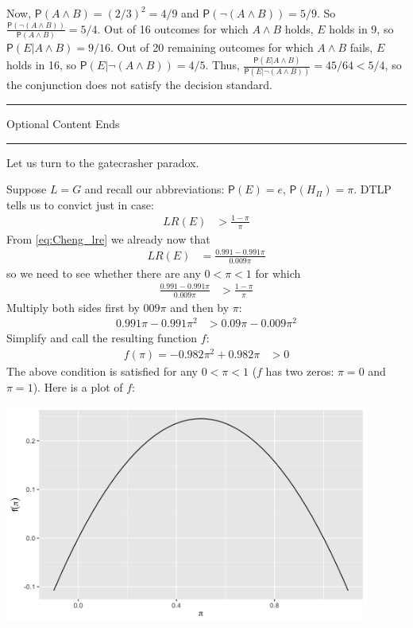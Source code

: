 \documentclass[10pt,dvipsnames,enabledeprecatedfontcommands]{scrartcl}
\newcommand{\n}{\neg}
\newcommand{\et}{\wedge}
\newcommand{\pr}[1]{\mathsf{P}(#1)}
\newcommand{\intermezzob}{\nopagebreak 
	\begin{minipage}[c]{13cm}
	\begin{center}\rule{10cm}{0.4pt}

	\tiny{\sc Optional Content Ends}
	
	\vspace{-1mm}
	
	\rule{10cm}{0.4pt}\end{center}
	\end{minipage}
	}
\begin{document}
Now, \(\pr{A\et B}=(2/3)^2=4/9\) and \(\pr{\n (A\et B)}=5/9\). So
\(\frac{\pr{\n(A\et B)}}{\pr{A\et B}}=5/4\). Out of 16 outcomes for
which \(A\et B\) holds, \(E\) holds in 9, so
\(\pr{E\vert A\et B}=9/16\). Out of 20 remaining outcomes for which
\(A\et B\) fails, \(E\) holds in 16, so \(\pr{E\vert \n (A\et B)}=4/5\).
Thus, \(\frac{\pr{E\vert A\et B}}{\pr{E\vert \n (A\et B)}}=45/64 <5/4\),
so the conjunction does not satisfy the decision standard.

\intermezzob

Let us turn to the gatecrasher paradox.

Suppose \(L=G\) and recall our abbreviations: \(\pr{E}=e\),
\(\pr{H_\Pi}=\pi\). DTLP tells us to convict just in case:
\begin{align*}
 LR(E) &> \frac{1-\pi}{\pi}
 \end{align*} \noindent From \eqref{eq:Cheng_lre} we already now that
\begin{align*}
 LR(E) & = \frac{0.991-0.991\pi}{0.009\pi}
 \end{align*} \noindent so we need to see whether there are any
\(0<\pi<1\) for which\\
\begin{align*}
  \frac{0.991-0.991\pi}{0.009\pi} &> \frac{1-\pi}{\pi}
 \end{align*} \noindent Multiply both sides first by \(009\pi\) and then
by \(\pi\): \begin{align*}
 0.991\pi - 0.991\pi^2 &> 0.09\pi - 0.009\pi^2
 \end{align*} \noindent Simplify and call the resulting function \(f\):
\begin{align*}
 f(\pi) = - 0.982 \pi^2 + 0.982\pi &>0 
 \end{align*} \noindent The above condition is satisfied for any
\(0<\pi <1\) (\(f\) has two zeros: \(\pi = 0\) and \(\pi = 1\)). Here is
a plot of \(f\):

\includegraphics[width=12cm]{f-gate.png}
\end{document}
